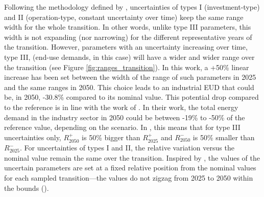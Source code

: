 %
%
%
%

Following the methodology defined by \citet{Moret2017}, uncertainties of types I (investment-type) and II (operation-type, constant uncertainty over time) keep the same range width for the whole transition. In other words, unlike type III parameters, this width is not expanding (nor narrowing) for the different representative years of the transition. However, parameters with an uncertainty increasing over time, type III, (\ie end-use demands, in this case) will have a wider and wider range over the transition (see Figure \ref{fig:ranges_transition}). In this work, a +50\% linear increase has been set between the width of the range of such parameters in 2025 and the same ranges in 2050. This choice leads to an industrial \gls{EUD} that could be, in 2050, -30.8\% compared to its nominal value. This potential drop compared to the reference is in line with the work of \citet{My2050}. In their work, the total energy demand in the industry sector in 2050 could be between -19\% to -50\% of the reference value, depending on the scenario. In , this means that for type III uncertainties only, $R_{2050}^+$ is 50\% bigger than $R_{2025}^+$ and $R_{2050}^-$ is 50\% smaller than $R_{2025}^-$. For uncertainties of types I and II, the relative variation versus the nominal value remain the same over the transition. Inspired by \citet{guevara2022modeling}, the values of the uncertain parameters are set at a fixed relative position from the nominal values for each sampled transition---the values do not zigzag from 2025 to 2050 within the bounds ().

